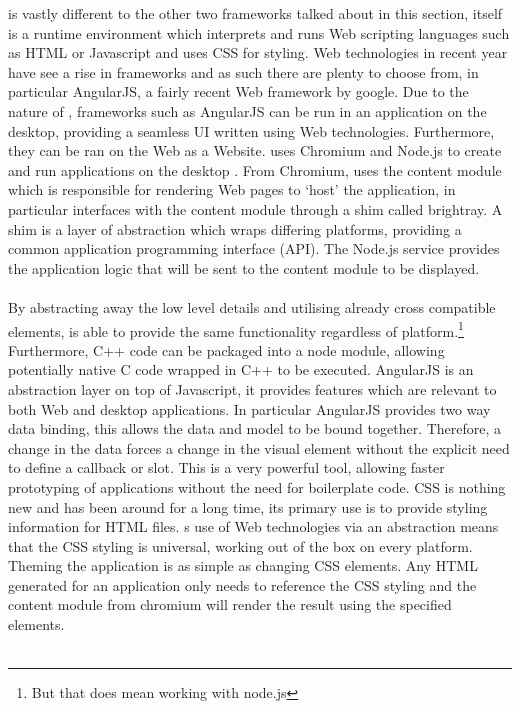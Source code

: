  is vastly different to the other two frameworks talked about in this section,  itself is a runtime environment which interprets and runs Web scripting languages such as HTML or Javascript and uses CSS for styling\cite{electron}. Web technologies in recent year have see a rise in frameworks and as such there are plenty to choose from, in particular AngularJS, a fairly recent Web framework by google. Due to the nature of , frameworks such as AngularJS can be run in an application on the desktop, providing a seamless UI written using Web technologies. Furthermore, they can be ran on the Web as a Website.
%
   uses Chromium and Node.js to create and run applications on the desktop \cite{electron_about}. From Chromium,  uses the content module which is responsible for rendering Web pages to `host' the application, in particular  interfaces with the content module through a shim called brightray\cite{electron_content_module}. A shim is a layer of abstraction which wraps differing platforms, providing a common application programming interface (API). The Node.js service provides the application logic that will be sent to the content module to be displayed.\\\\
  By abstracting away the low level details and utilising already cross compatible elements,  is able to provide the same functionality regardless of platform.\footnote{But that does mean working with node.js} Furthermore, C++ code can be packaged into a node module, allowing potentially native C code wrapped in C++ to be executed.
  AngularJS is an abstraction layer on top of Javascript, it provides features which are relevant to both Web and desktop applications\cite{angular}. In particular AngularJS provides two way data binding, this allows the data and model to be bound together\cite{angular_data_binding}. Therefore, a change in the data forces a change in the visual element without the explicit need to define a callback or slot. This is a very powerful tool, allowing faster prototyping of applications without the need for boilerplate code.
  CSS is nothing new and has been around for a long time, its primary use is to provide styling information for HTML files. s use of Web technologies via an abstraction means that the CSS styling is universal, working out of the box on every platform. Theming the application is as simple as changing CSS elements. Any HTML generated for an application only needs to reference the CSS styling and the content module from chromium will render the result using the specified elements.\\\\
